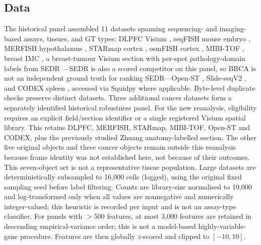 \documentclass[journal]{IEEEtran}
\begin{document}
\subsection{Data}
The historical panel assembled 11 datasets spanning sequencing- and imaging-based assays, tissues, and
GT types: DLPFC Visium \citep{maynard2021dlpfc}, seqFISH mouse embryo
\citep{lohoff2022seqfish}, MERFISH hypothalamus \citep{moffitt2018merfish}, STARmap cortex
\citep{wang2018starmap}, osmFISH cortex \citep{codeluppi2018osmfish}, MIBI-TOF \citep{hartmann2021scmep},
breast IMC \citep{jackson2020imc}, a breast-tumour Visium section \citep{tenx2020brca} with per-spot
pathology-domain labels from SEDR \citep{xu2024sedr}---SEDR is also a scored competitor on this
panel, so BRCA is not an independent ground truth for ranking SEDR---Open-ST \citep{schott2024openst},
Slide-seqV2 \citep{stickels2021slideseq}, and CODEX spleen \citep{goltsev2018codex}, accessed via
Squidpy \citep{palla2022squidpy} where applicable.
Byte-level duplicate checks preserve distinct datasets. Three additional cancer datasets form a separately identified historical robustness panel. For the new reanalysis, eligibility requires an explicit field/section identifier or a single registered Visium spatial library. This retains DLPFC, MERFISH, STARmap, MIBI-TOF, Open-ST and CODEX, plus the previously studied Zhuang anatomy-labelled section. The other five original objects and three cancer objects remain outside this reanalysis because frame identity was not established here, not because of their outcomes. This seven-object set is not a representative tissue population. Large datasets are deterministically subsampled to 16{,}000 cells (logged), using the original fixed sampling seed before label filtering. Counts are
library-size normalised to 10,000 and log-transformed only when all values are nonnegative and numerically integer-valued; this heuristic is recorded per input and is not an assay-type classifier. For panels with $>500$ features, at most 3,000 features are retained in descending empirical-variance order; this is not a model-based highly-variable-gene procedure. Features are then globally $z$-scored and clipped to $[-10,10]$.
\end{document}
